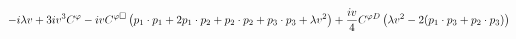 %
\begin{dmath*}
%
  -  i \lambda v   +  3 i v^3C^{\varphi }  -  i vC^{ \varphi  \Box} \left(p_{1}\nobreak\cdot\nobreak{}p_{1} + 2 p_{1}\nobreak\cdot\nobreak{}p_{2} + p_{2}\nobreak\cdot\nobreak{}p_{2} + p_{3}\nobreak\cdot\nobreak{}p_{3} + \lambda v^2\right)  +  \frac{i v}{4}C^{ \varphi  D} \left(\lambda v^2 - 2 (p_{1}\nobreak\cdot\nobreak{}p_{3} + p_{2}\nobreak\cdot\nobreak{}p_{3})\right)
%
\end{dmath*}
%
